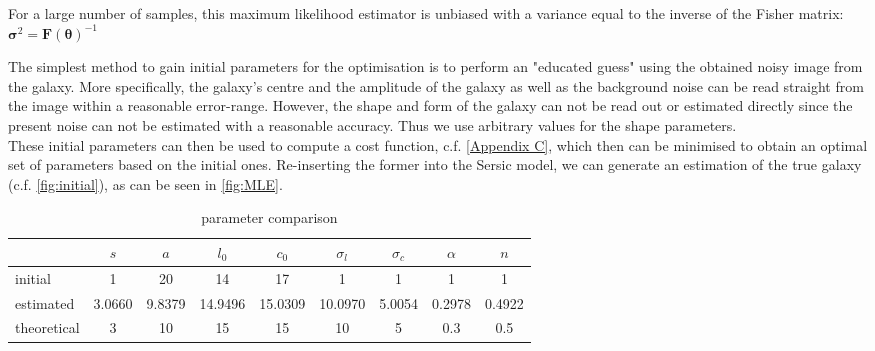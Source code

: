 For a large number of samples, this maximum likelihood estimator is unbiased with a variance equal to the inverse of the Fisher matrix: $\boldsymbol{\sigma}^{2}=\boldsymbol{F}(\boldsymbol{\theta})^{-1}$


The simplest method to gain initial parameters for the optimisation is to perform an "educated guess"  using the obtained noisy image from the galaxy. More specifically, the galaxy's centre and the amplitude of the galaxy as well as the background noise can be read straight from the image within a reasonable error-range. However, the shape and form of the galaxy can not be read out or estimated directly since the present noise can not be estimated with a reasonable accuracy. Thus we use arbitrary values for the shape parameters.\\
These initial parameters can then be used to compute a cost function, c.f. \cref{Appendix C}, which then can be minimised to obtain an optimal set of parameters based on the initial ones. Re-inserting the former into the Sersic model, we can generate an estimation of the true galaxy (c.f. \cref{fig:initial}), as can be seen in \cref{fig:MLE}.


\begin{table}[h!]
\centering
\begin{tabular}{ l | c c c c c c c c}
	& $s$ & $a$ & $l_0$ & $c_0$ & $\sigma_l$ & $\sigma_c$ & $\alpha$ & $n$ \\
	\hline
	initial & 1 & 20 & 14 & 17 & 1 & 1 & 1 & 1 \\
	estimated & 3.0660 & 9.8379 & 14.9496 & 15.0309 & 10.0970 & 5.0054 & 0.2978 & 0.4922 \\
	theoretical & 3 & 10 & 15 & 15 & 10 & 5 & 0.3 & 0.5
\end{tabular}
\caption{parameter comparison}
\label{tab:param}
\end{table}

